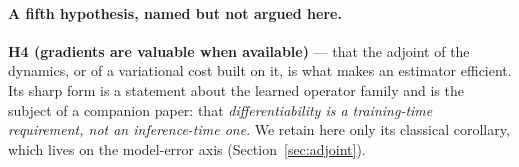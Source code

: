 \paragraph{A fifth hypothesis, named but not argued here.}
\textbf{H4 (gradients are valuable when available)} --- that the adjoint of the
dynamics, or of a variational cost built on it, is what makes an estimator
efficient. Its sharp form is a statement about the learned operator family and is
the subject of a companion paper: that \emph{differentiability is a training-time
requirement, not an inference-time one}. We retain here only its classical
corollary, which lives on the model-error axis
(Section~\ref{sec:adjoint}).
